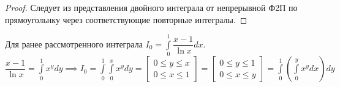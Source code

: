 \documentclass[../../main.tex]{subfiles}
\begin{document}
\begin{proof}
	Следует из представления двойного интеграла от непрерывной Ф2П по
	прямоугольнку через соответствующие повторные интегралы.
\end{proof}
\begin{exmp}
	Для ранее рассмотренного интеграла $ I_0 = 
	\int\limits_0^1 \dfrac{x - 1}{\ln x} dx $.
	$ \dfrac{x - 1}{\ln x} = \int\limits_0^1 x^y dy \implies I_0 = 
	\int\limits_0^1 \int\limits_0^x x^y dy = \left[
	\begin{gathered}
		0 \leq y \leq x\\
		0 \leq x \leq 1
	\end{gathered}
	\right] = \left[
	\begin{gathered}
		0 \leq y \leq 1\\
		0 \leq x \leq y
	\end{gathered}
	\right] = \int\limits_0^1 \left(\int\limits_0^y x^y dx\right)dy
	$
\end{exmp}
\end{document}
